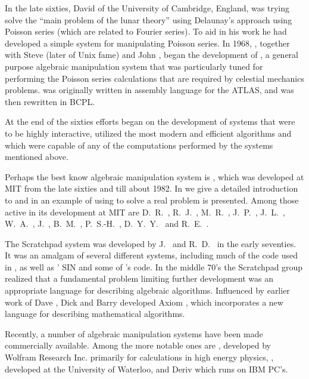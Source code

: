 In the late sixties, David {\BartonDRa} of the University of
Cambridge, England, was trying solve the ``main problem of the lunar
theory'' using Delaunay's approach using Poisson series (which are
related to Fourier series).  To aid in his work he had developed a
simple system for manipulating Poisson series.  In 1968, {\BartonDRa},
together with Steve {\Bourne} (later of Unix fame) and John {\Fitch},
began the development of {\Camal} \cite{Fitch75}, a general purpose
algebraic manipulation system that was particularly tuned for
performing the Poisson series calculations that are required by
celestial mechanics problems.  {\Camal} was originally written in
assembly language for the ATLAS, and was then rewritten in BCPL.

At the end of the sixties efforts began on the development of systems that
were to be highly interactive, utilized the most modern and efficient
algorithms and which were capable of any of the computations performed by
the systems mentioned above.

Perhaps the best know algebraic manipulation system is {\Macsyma}, which
was developed at MIT from the late sixties and till about 1982.  In
 we give a detailed introduction to
{\Macsyma} and in  an example of using
{\Macsyma} to solve a real problem is presented.  Among those active
in its development at MIT are D.~R.~{\BartonDRb}, R.~J.~{\Fateman},
M.~R.~{\Genesereth}, J.~P.~{\Golden}, J.~L.~{\Kulp}, W.~A.~{\MartinW},
J.~{\MosesJ}, B.~M.~{\Trager}, P.~S.-H.~{\WangP}, D.~Y.~Y.~{\Yun} and
R.~E.~{\Zippel}.

The Scratchpad system was developed by J.~{\Griesmer} and R.~D.~{\Jenks} in
the early seventies.  It was an amalgam of several different systems,
including much of the code used in {\Mathlab}, as well as {\MosesJ}' SIN
and some of {\MartinW}'s code.  In the middle 70's the Scratchpad group
realized that a fundamental problem limiting further development was
an appropriate language for describing algebraic algorithms.
Influenced by earlier work of Dave {\BartonDRb}, Dick {\Jenks} and Barry
{\Trager} developed Axiom \cite{Jenks92}, which incorporates a new
language for describing mathematical algorithms.

 
Recently, a number of algebraic manipulation systems have been made
commercially available.  Among the more notable ones are {\Mathematica}
\cite{Wolfram88}, developed by Wolfram Research Inc. primarily for
calculations in high energy physics, {\Maple} \cite{Maple:Manual},
developed at the University of Waterloo, and Deriv which runs on IBM
PC's.

